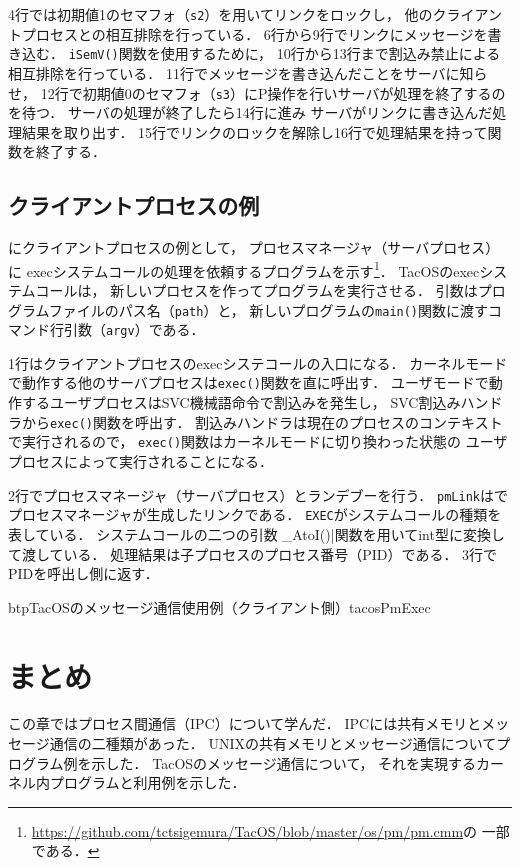 4行では初期値1のセマフォ（{\tt s2}）を用いてリンクをロックし，
他のクライアントプロセスとの相互排除を行っている．
6行から9行でリンクにメッセージを書き込む．
{\tt iSemV()}関数を使用するために，
10行から13行まで割込み禁止による相互排除を行っている．
11行でメッセージを書き込んだことをサーバに知らせ，
12行で初期値0のセマフォ（{\tt s3}）にP操作を行いサーバが処理を終了するのを待つ．
サーバの処理が終了したら14行に進み
サーバがリンクに書き込んだ処理結果を取り出す．
15行でリンクのロックを解除し16行で処理結果を持って関数を終了する．

\subsection{クライアントプロセスの例}
にクライアントプロセスの例として，
プロセスマネージャ（サーバプロセス）に
execシステムコールの処理を依頼するプログラムを示す\footnote{
\url{https://github.com/tctsigemura/TacOS/blob/master/os/pm/pm.cmm}の
一部である．}．
TacOSのexecシステムコールは，
新しいプロセスを作ってプログラムを実行させる．
引数はプログラムファイルのパス名（{\tt path}）と，
新しいプログラムの{\tt main()}関数に渡すコマンド行引数（{\tt argv}）である．

1行はクライアントプロセスのexecシステコールの入口になる．
カーネルモードで動作する他のサーバプロセスは{\tt exec()}関数を直に呼出す．
ユーザモードで動作するユーザプロセスはSVC機械語命令で割込みを発生し，
SVC割込みハンドラから{\tt exec()}関数を呼出す．
割込みハンドラは現在のプロセスのコンテキストで実行されるので，
{\tt exec()}関数はカーネルモードに切り換わった状態の
ユーザプロセスによって実行されることになる．

2行でプロセスマネージャ（サーバプロセス）とランデブーを行う．
{\tt pmLink}はで
プロセスマネージャが生成したリンクである．
{\tt EXEC}がシステムコールの種類を表している．
システムコールの二つの引数は\|_AtoI()|関数を用いてint型に変換して渡している．
処理結果は子プロセスのプロセス番号（PID）である．
3行でPIDを呼出し側に返す．

\begin{myfig}{btp}{TacOSのメッセージ通信使用例（クライアント側）}{tacosPmExec}

\end{myfig}

\section{まとめ}
この章ではプロセス間通信（IPC）について学んだ．
IPCには共有メモリとメッセージ通信の二種類があった．
UNIXの共有メモリとメッセージ通信についてプログラム例を示した．
TacOSのメッセージ通信について，
それを実現するカーネル内プログラムと利用例を示した．
